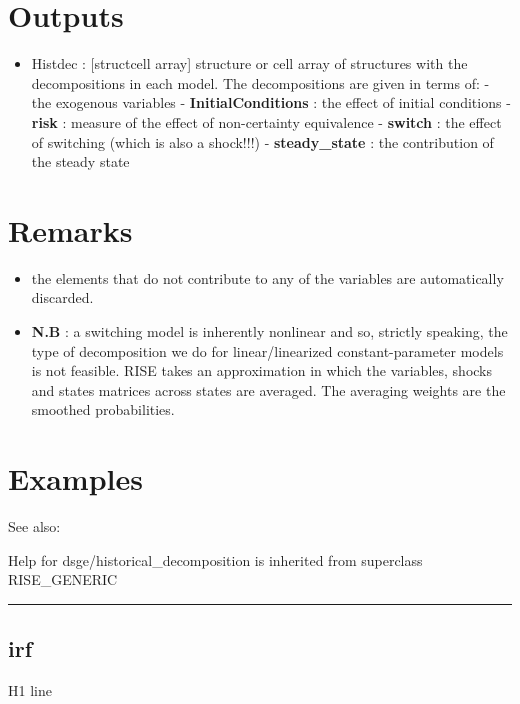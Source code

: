 \documentclass[letterpaper,10pt,english]{sphinxmanual}
\begin{document}
\section{Outputs}
\label{classes/models/@dsge/dsge:id60}\begin{itemize}
\item {} 
Histdec : {[}struct\textbar{}cell array{]} structure or cell array of structures
with the decompositions in each model. The decompositions are given in
terms of:
- the exogenous variables
- \textbf{InitialConditions} : the effect of initial conditions
- \textbf{risk} : measure of the effect of non-certainty equivalence
- \textbf{switch} : the effect of switching (which is also a shock!!!)
- \textbf{steady\_state} : the contribution of the steady state

\end{itemize}


\section{Remarks}
\label{classes/models/@dsge/dsge:remarks}\begin{itemize}
\item {} 
the elements that do not contribute to any of the variables are
automatically discarded.

\item {} 
\textbf{N.B} : a switching model is inherently nonlinear and so, strictly
speaking, the type of decomposition we do for linear/linearized
constant-parameter models is not feasible. RISE takes an approximation
in which the variables, shocks and states matrices across states are
averaged. The averaging weights are the smoothed probabilities.

\end{itemize}


\section{Examples}
\label{classes/models/@dsge/dsge:id61}
See also:

Help for dsge/historical\_decomposition is inherited from superclass RISE\_GENERIC


\bigskip\hrule{}\bigskip



\subsection{irf}
\label{classes/models/@dsge/dsge:irf}\label{classes/models/@dsge/dsge:id62}
H1 line
\end{document}
